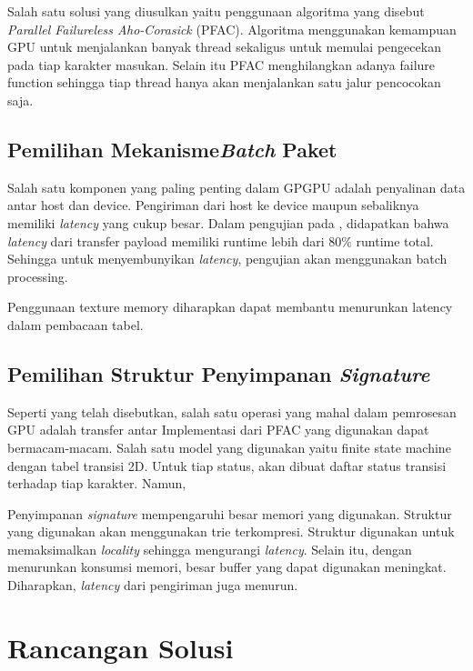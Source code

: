       Salah satu solusi yang diusulkan yaitu penggunaan algoritma yang disebut \emph{Parallel Failureless Aho-Corasick} (PFAC). Algoritma menggunakan kemampuan GPU untuk menjalankan banyak thread sekaligus untuk memulai pengecekan pada tiap karakter masukan. Selain itu PFAC menghilangkan adanya failure function sehingga tiap thread hanya akan menjalankan satu jalur pencocokan saja. 

    \subsection{Pemilihan Mekanisme\emph{Batch} Paket}

      Salah satu komponen yang paling penting dalam GPGPU adalah penyalinan data antar host dan device. Pengiriman dari host ke device maupun sebaliknya memiliki \emph{latency} yang cukup besar. Dalam pengujian pada \citep{gnort2008}, didapatkan bahwa \emph{latency} dari transfer payload memiliki runtime lebih dari 80\% runtime total. Sehingga untuk menyembunyikan \emph{latency}, pengujian akan menggunakan batch processing. 

     

      Penggunaan texture memory diharapkan dapat membantu menurunkan latency dalam pembacaan tabel.
      

    \subsection{Pemilihan Struktur Penyimpanan \emph{Signature}}

      Seperti yang telah disebutkan, salah satu operasi yang mahal dalam pemrosesan GPU adalah transfer antar Implementasi dari PFAC yang digunakan dapat bermacam-macam. Salah satu model yang digunakan yaitu finite state machine dengan tabel transisi 2D. Untuk tiap status, akan dibuat daftar status transisi terhadap tiap karakter. Namun, 

      Penyimpanan \emph{signature} mempengaruhi besar memori yang digunakan. Struktur yang digunakan akan menggunakan trie terkompresi. Struktur digunakan untuk memaksimalkan \emph{locality} sehingga mengurangi \emph{latency}. Selain itu, dengan menurunkan konsumsi memori, besar buffer yang dapat digunakan meningkat. Diharapkan, \emph{latency} dari pengiriman juga menurun.

  \section{Rancangan Solusi}

